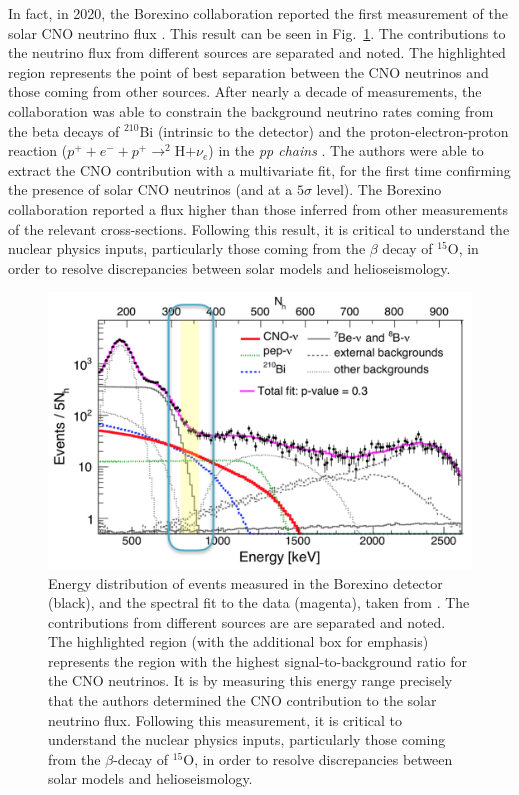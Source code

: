 In fact, in 2020, the Borexino collaboration reported the first measurement of the solar CNO neutrino flux \cite{agostini2020direct}. This result can be seen in Fig.\ \ref{fig: borexinoSpectrum}. The contributions to the neutrino flux from different sources are separated and noted. The highlighted region represents the point of best separation between the CNO neutrinos and those coming from other sources. After nearly a decade of measurements, the collaboration was able to constrain the background neutrino rates coming from the beta decays of $^{210}$Bi (intrinsic to the detector) and the proton-electron-proton reaction ($p^{+} + e^{-} + p^{+} \rightarrow ^{2}$H$ + \nu_{e}$) in the \textit{pp chains} \cite{agostini2020sensitivity}. The authors were able to extract the CNO contribution with a multivariate fit, for the first time confirming the presence of solar CNO neutrinos (and at a $5 \sigma $ level). The Borexino collaboration reported a flux higher than those inferred from other measurements of the relevant cross-sections. Following this result, it is critical to understand the nuclear physics inputs, particularly those coming from the $\beta$ decay of $^{15}$O, in order to resolve discrepancies between solar models and helioseismology.


\begin{figure}
\centering
\includegraphics[width=\linewidth]{figures/borexino_result.png}
\caption{Energy distribution of events measured in the Borexino detector (black), and the spectral fit to the data (magenta), taken from \cite{agostini2020direct}. The contributions from different sources are are separated and noted. The highlighted region (with the additional box for emphasis) represents the region with the highest signal-to-background ratio for the CNO neutrinos. It is by measuring this energy range precisely that the authors determined the CNO contribution to the solar neutrino flux. Following this measurement, it is critical to understand the nuclear physics inputs, particularly those coming from the $\beta$-decay of $^{15}$O, in order to resolve discrepancies between solar models and helioseismology.   }
\label{fig: borexinoSpectrum}
\end{figure}


